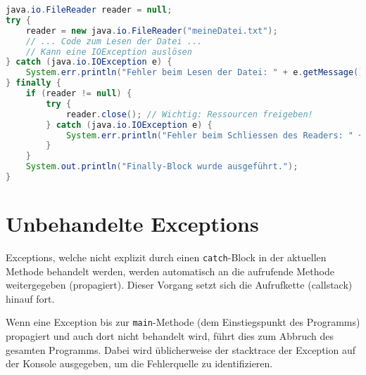 \begin{lstlisting}[language=Java, caption={Beispiel für einen finally-Block}, label=lst:finallyblock_beispiel]
java.io.FileReader reader = null;
try {
    reader = new java.io.FileReader("meineDatei.txt");
    // ... Code zum Lesen der Datei ...
    // Kann eine IOException auslösen
} catch (java.io.IOException e) {
    System.err.println("Fehler beim Lesen der Datei: " + e.getMessage());
} finally {
    if (reader != null) {
        try {
            reader.close(); // Wichtig: Ressourcen freigeben!
        } catch (java.io.IOException e) {
            System.err.println("Fehler beim Schliessen des Readers: " + e.getMessage());
        }
    }
    System.out.println("Finally-Block wurde ausgeführt.");
}
\end{lstlisting}

\section{Unbehandelte Exceptions}

Exceptions, welche nicht explizit durch einen \texttt{catch}-Block in der
aktuellen Methode behandelt werden, werden automatisch an die aufrufende
Methode weitergegeben (propagiert). Dieser Vorgang setzt sich die Aufrufkette
(\gls{callstack}) hinauf fort.

Wenn eine Exception bis zur \texttt{main}-Methode (dem Einstiegspunkt des
Programms) propagiert und auch dort nicht behandelt wird, führt dies zum
Abbruch des gesamten Programms. Dabei wird üblicherweise der \gls{stacktrace}
der Exception auf der Konsole ausgegeben, um die Fehlerquelle zu
identifizieren.

